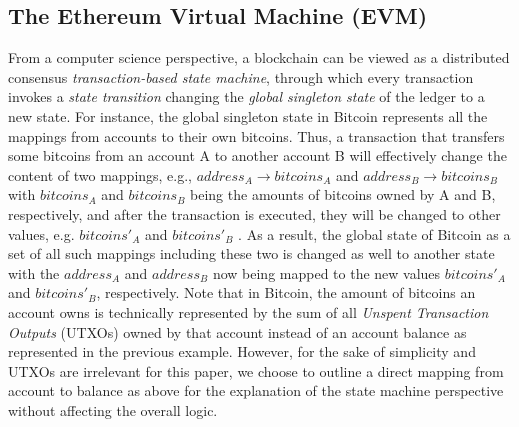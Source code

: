 \subsection{The Ethereum Virtual Machine (EVM)}

From a computer science perspective, a blockchain can be viewed as a distributed consensus \textit{transaction-based state machine}, through which every transaction invokes a \textit{state transition} changing the \textit{global singleton state} of the ledger to a new state. For instance, the global singleton state in Bitcoin represents all the mappings from accounts to their own bitcoins. Thus, a transaction that transfers some bitcoins from an account A to another account B will effectively change the content of two mappings, e.g., $address_A \rightarrow bitcoins_A$ and $address_B \rightarrow bitcoins_B$ with $bitcoins_A$ and $bitcoins_B$ being the amounts of bitcoins owned by A and B, respectively, and after the transaction is executed, they will be changed to other values, e.g. $bitcoins'_A$ and $bitcoins'_B$ . As a result, the global state of Bitcoin as a set of all such mappings including these two is changed as well to another state with the $address_A$ and $address_B$ now being mapped to the new values $bitcoins'_A$ and $bitcoins'_B$, respectively. Note that in Bitcoin, the amount of bitcoins an account owns is technically represented by the sum of all \textit{Unspent Transaction Outputs} (UTXOs) \cite{narayanan2016bitcoin} owned by that account instead of an account balance as represented in the previous example. However, for the sake of simplicity and UTXOs are irrelevant for this paper, we choose to outline a direct mapping from account to balance as above for the explanation of the state machine perspective without affecting the overall logic.

